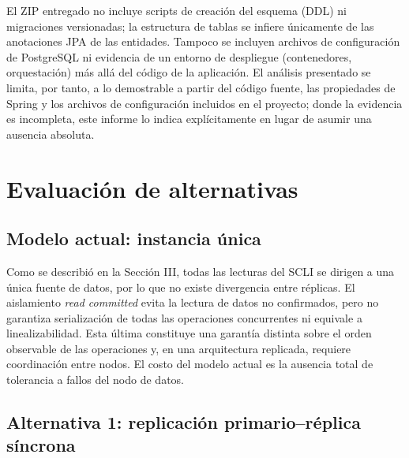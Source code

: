 \documentclass[conference]{IEEEtran}
\begin{document}
El ZIP entregado no incluye scripts de creaci\'on del esquema (DDL) ni migraciones versionadas; la estructura de tablas se infiere \'unicamente de las anotaciones JPA de las entidades. Tampoco se incluyen archivos de configuraci\'on de PostgreSQL ni evidencia de un entorno de despliegue (contenedores, orquestaci\'on) m\'as all\'a del c\'odigo de la aplicaci\'on. El an\'alisis presentado se limita, por tanto, a lo demostrable a partir del c\'odigo fuente, las propiedades de Spring y los archivos de configuraci\'on incluidos en el proyecto; donde la evidencia es incompleta, este informe lo indica expl\'icitamente en lugar de asumir una ausencia absoluta.

\section{Evaluaci\'on de alternativas}

\subsection{Modelo actual: instancia \'unica}

Como se describi\'o en la Secci\'on III, todas las lecturas del SCLI se dirigen a una \'unica fuente de datos, por lo que no existe divergencia entre r\'eplicas. El aislamiento \emph{read committed} evita la lectura de datos no confirmados, pero no garantiza serializaci\'on de todas las operaciones concurrentes ni equivale a linealizabilidad. Esta \'ultima constituye una garant\'ia distinta sobre el orden observable de las operaciones y, en una arquitectura replicada, requiere coordinaci\'on entre nodos. El costo del modelo actual es la ausencia total de tolerancia a fallos del nodo de datos.

\subsection{Alternativa 1: replicaci\'on primario--r\'eplica s\'incrona}
\end{document}
